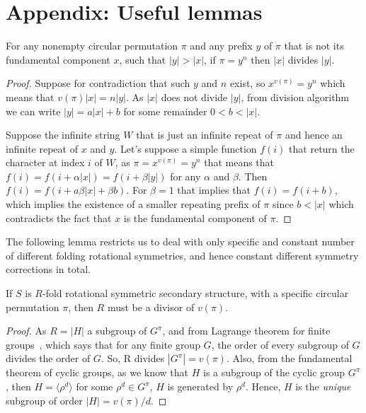 \section{Appendix: Useful lemmas}\label{sec:lemmasApp}
\begin{lemma}[factors of $\pi$]\label{lem:factors}
	For any nonempty circular permutation $\pi$ 
	and any prefix $y$ of $\pi$ that is not its fundamental component $x$, 
	such that $|y|>|x|$, 
	if $\pi = y^n$ then $|x|$ divides $|y|$.    
\end{lemma}
\begin{proof}
	Suppose for contradiction that such $y$ and $n$ exist, so $x^{v(\pi)} = y^n$ which means that $v(\pi)|x| = n|y|$. As $|x|$ does not divide $|y|$, from division algorithm we can write $|y| = a |x| + b$ for some remainder $0<b<|x|$.
	
	Suppose the infinite string $W$ that is just an infinite repeat of $\pi$ and hence an infinite repeat of $x$ and $y$. Let's suppose a simple function $f(i)$ that return the character at index $i$ of $W$, as $\pi = x^{v(\pi)} = y^n$ that means that $f(i) = f(i+\alpha|x|) = f(i+\beta|y|)$ for any $\alpha$ and $\beta$. Then $f(i) = f(i+ a\beta |x| + \beta b)$. For $\beta = 1$ that implies that $f(i) = f(i+b)$, which implies the  existence of a smaller repeating prefix of $\pi$ since $b<|x|$ which contradicts the fact that $x$ is the fundamental component of $\pi$.   
\end{proof}


The following lemma restricts us to deal with only specific and constant number of different folding rotational symmetries, and hence constant different symmetry corrections in total. 
\begin{lemma}\label{lem:div}
	If $S$ is $R$-fold rotational symmetric secondary structure, with a specific circular permutation $\pi$, then $R$ must be a divisor of $v(\pi)$.
\end{lemma}

\begin{proof}
	As $R = |H|$ a subgroup of $G^\pi$, and from Lagrange theorem for finite groups~\cite{nicholson2012introduction}, which says that for any finite group $G$, the order of every subgroup of $G$ divides the order of $G$. So, R divides $|G^\pi| = v(\pi)$. Also, from the fundamental theorem of cyclic groups, as we know that $H$ is a subgroup of the cyclic group $G^\pi$, then $H = \langle \rho^d \rangle$ for some $\rho^d \in G^\pi$, $H$ is generated by $\rho^d$. Hence, $H$ is the \emph{unique} subgroup of order $|H|= v(\pi)/d$. 
\end{proof}



